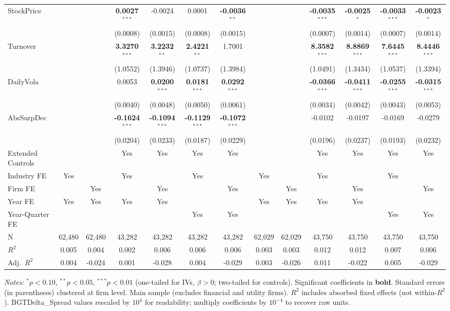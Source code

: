 \documentclass[11pt,a4paper]{article}
\begin{document}
\begin{table}[htbp]
\begin{tabular}{lcccccccccccc}
StockPrice &  &  & \textbf{0.0027}$^{***}$ & -0.0024 & 0.0001 & \textbf{-0.0036}$^{**}$ &  &  & \textbf{-0.0035}$^{***}$ & \textbf{-0.0025}$^{*}$ & \textbf{-0.0033}$^{***}$ & \textbf{-0.0023}$^{*}$ \\
 &  &  & (0.0008) & (0.0015) & (0.0008) & (0.0015) &  &  & (0.0007) & (0.0014) & (0.0007) & (0.0014) \\
Turnover &  &  & \textbf{3.3270}$^{***}$ & \textbf{3.2232}$^{**}$ & \textbf{2.4221}$^{**}$ & 1.7001 &  &  & \textbf{8.3582}$^{***}$ & \textbf{8.8869}$^{***}$ & \textbf{7.6445}$^{***}$ & \textbf{8.4446}$^{***}$ \\
 &  &  & (1.0552) & (1.3946) & (1.0737) & (1.3984) &  &  & (1.0491) & (1.3434) & (1.0537) & (1.3394) \\
DailyVola &  &  & 0.0053 & \textbf{0.0200}$^{***}$ & \textbf{0.0181}$^{***}$ & \textbf{0.0292}$^{***}$ &  &  & \textbf{-0.0366}$^{***}$ & \textbf{-0.0411}$^{***}$ & \textbf{-0.0255}$^{***}$ & \textbf{-0.0315}$^{***}$ \\
 &  &  & (0.0040) & (0.0048) & (0.0050) & (0.0061) &  &  & (0.0034) & (0.0042) & (0.0043) & (0.0053) \\
AbsSurpDec &  &  & \textbf{-0.1624}$^{***}$ & \textbf{-0.1094}$^{***}$ & \textbf{-0.1129}$^{***}$ & \textbf{-0.1072}$^{***}$ &  &  & -0.0102 & -0.0197 & -0.0169 & -0.0279 \\
 &  &  & (0.0204) & (0.0233) & (0.0187) & (0.0229) &  &  & (0.0196) & (0.0237) & (0.0193) & (0.0232) \\
\midrule
Extended Controls &  &  & Yes & Yes & Yes & Yes &  &  & Yes & Yes & Yes & Yes \\
Industry FE & Yes &  & Yes &  & Yes &  & Yes &  & Yes &  & Yes &  \\
Firm FE &  & Yes &  & Yes &  & Yes &  & Yes &  & Yes &  & Yes \\
Year FE & Yes & Yes & Yes & Yes &  &  & Yes & Yes & Yes & Yes &  &  \\
Year-Quarter FE &  &  &  &  & Yes & Yes &  &  &  &  & Yes & Yes \\
\midrule
N & 62,480 & 62,480 & 43,282 & 43,282 & 43,282 & 43,282 & 62,029 & 62,029 & 43,750 & 43,750 & 43,750 & 43,750 \\
$R^2$ & 0.005 & 0.004 & 0.002 & 0.006 & 0.006 & 0.006 & 0.003 & 0.003 & 0.012 & 0.012 & 0.007 & 0.006 \\
Adj.~$R^2$ & 0.004 & -0.024 & 0.001 & -0.028 & 0.004 & -0.029 & 0.003 & -0.026 & 0.011 & -0.022 & 0.005 & -0.029 \\
\bottomrule
\end{tabular}
\begin{minipage}{\linewidth}
\vspace{2pt}\scriptsize
\textit{Notes:} $^{*}p<0.10$, $^{**}p<0.05$, $^{***}p<0.01$ (one-tailed for IVs, $\beta > 0$; two-tailed for controls).
 Significant coefficients in \textbf{bold}.
 Standard errors (in parentheses) clustered at firm level.
 Main sample (excludes financial and utility firms).
 $R^2$ includes absorbed fixed effects (not within-$R^2$).
 BGTDelta\_Spread values rescaled by $10^4$ for readability; multiply coefficients by $10^{-4}$ to recover raw units.
\end{minipage}
\end{table}
\end{document}
